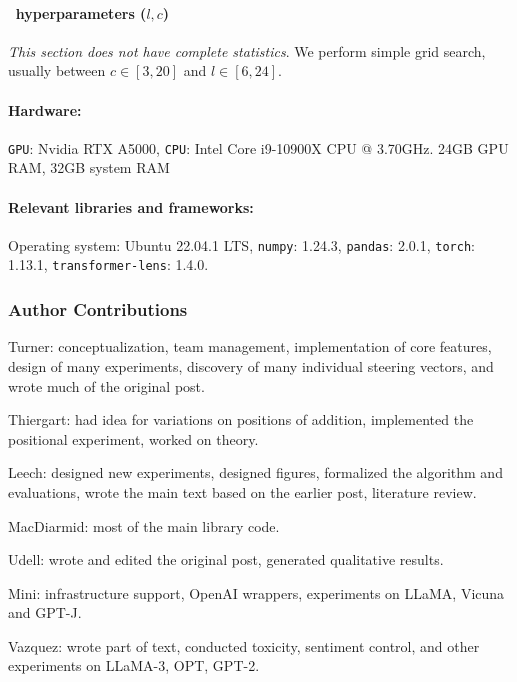 \documentclass{article}
\newcommand{\shortmethod}{\text{ActAdd}}
\theoremstyle{plain}
\theoremstyle{definition}
\theoremstyle{remark}
\begin{document}
\paragraph{\shortmethod\, hyperparameters ($l, c$)} \textit{This section does not have complete statistics}. We perform simple grid search, usually between $c \in [3,20]$ and $l \in [6,24]$.


\paragraph{Hardware:} 
\texttt{GPU}: Nvidia RTX A5000, \texttt{CPU}: Intel Core i9-10900X CPU @ 3.70GHz. 24GB GPU RAM, 32GB system RAM

\noindent\paragraph{Relevant libraries and frameworks:}
Operating system: Ubuntu 22.04.1 LTS, \texttt{numpy}: 1.24.3, \texttt{pandas}: 2.0.1, \texttt{torch}: 1.13.1, \texttt{transformer-lens}: 1.4.0.

\subsubsection*{Author Contributions}
Turner: conceptualization, team management, implementation of core features, design of many experiments, discovery of many individual steering vectors, and wrote much of the original post. 

Thiergart: had idea for variations on positions of addition, implemented the positional experiment, worked on theory.

Leech: designed new experiments, designed figures, formalized the algorithm and evaluations, wrote the main text based on the earlier post, literature review.

MacDiarmid: most of the main library code.

Udell: wrote and edited the original post, generated qualitative results.

Mini: infrastructure support, OpenAI wrappers, experiments on LLaMA, Vicuna and GPT-J.


Vazquez: wrote part of text, conducted toxicity, sentiment control, and other experiments on LLaMA-3, OPT, GPT-2.
\end{document}
